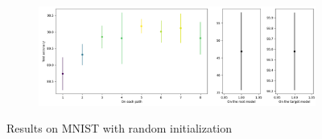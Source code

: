 \documentclass{article}
\begin{document}
\begin{figure}[htbp]
    \vspace{0.5cm}
    
    \begin{subfigure}[b]{0.5\textwidth}
        \centering
        \includegraphics[width=\textwidth]{imgs/statistical_reliability_MNIST_random_2024_05_02_14_52_58.png}
    \end{subfigure}
    \caption{Results on MNIST with random initialization}
\end{figure}
\end{document}
